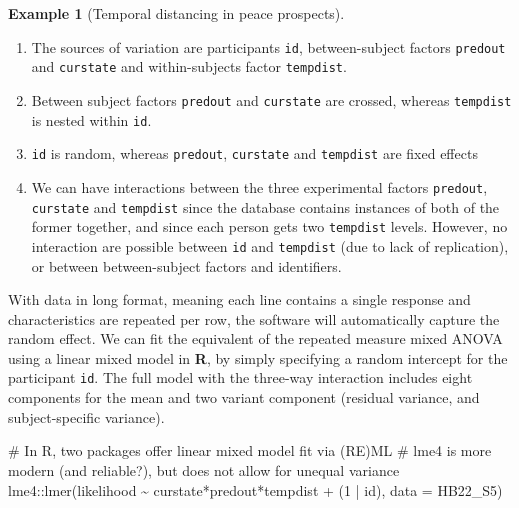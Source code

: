 \documentclass[
  11pt,
  letterpaper,
]{scrbook}
\newenvironment{Shaded}{\begin{snugshade}}{\end{snugshade}}
\newcommand{\AttributeTok}[1]{\textcolor[rgb]{0.40,0.45,0.13}{#1}}
\newcommand{\CommentTok}[1]{\textcolor[rgb]{0.37,0.37,0.37}{#1}}
\newcommand{\DecValTok}[1]{\textcolor[rgb]{0.68,0.00,0.00}{#1}}
\newcommand{\FunctionTok}[1]{\textcolor[rgb]{0.28,0.35,0.67}{#1}}
\newcommand{\NormalTok}[1]{\textcolor[rgb]{0.00,0.23,0.31}{#1}}
\newcommand{\SpecialCharTok}[1]{\textcolor[rgb]{0.37,0.37,0.37}{#1}}
\providecommand{\tightlist}{%
  \setlength{\itemsep}{0pt}\setlength{\parskip}{0pt}}\usepackage{longtable,booktabs,array}
\theoremstyle{definition}
\theoremstyle{definition}
\newtheorem{example}{Example}[chapter]
\theoremstyle{remark}
\begin{document}
\begin{example}[Temporal distancing in peace
prospects]
\begin{enumerate}
\def\labelenumi{\arabic{enumi}.}
\tightlist
\item
  The sources of variation are participants \texttt{id}, between-subject
  factors \texttt{predout} and \texttt{curstate} and within-subjects
  factor \texttt{tempdist}.
\item
  Between subject factors \texttt{predout} and \texttt{curstate} are
  crossed, whereas \texttt{tempdist} is nested within \texttt{id}.
\item
  \texttt{id} is random, whereas \texttt{predout}, \texttt{curstate} and
  \texttt{tempdist} are fixed effects
\item
  We can have interactions between the three experimental factors
  \texttt{predout}, \texttt{curstate} and \texttt{tempdist} since the
  database contains instances of both of the former together, and since
  each person gets two \texttt{tempdist} levels. However, no interaction
  are possible between \texttt{id} and \texttt{tempdist} (due to lack of
  replication), or between between-subject factors and identifiers.
\end{enumerate}

With data in long format, meaning each line contains a single response
and characteristics are repeated per row, the software will
automatically capture the random effect. We can fit the equivalent of
the repeated measure mixed ANOVA using a linear mixed model in
\textbf{R}, by simply specifying a random intercept for the participant
\texttt{id}. The full model with the three-way interaction includes
eight components for the mean and two variant component (residual
variance, and subject-specific variance).

\begin{Shaded}
\begin{Highlighting}[]
\CommentTok{\# In R, two packages offer linear mixed model fit via (RE)ML}
\CommentTok{\# lme4 is more modern (and reliable?), but does not allow for unequal variance}
\NormalTok{lme4}\SpecialCharTok{::}\FunctionTok{lmer}\NormalTok{(likelihood }\SpecialCharTok{\textasciitilde{}}\NormalTok{ curstate}\SpecialCharTok{*}\NormalTok{predout}\SpecialCharTok{*}\NormalTok{tempdist }\SpecialCharTok{+}\NormalTok{ (}\DecValTok{1} \SpecialCharTok{|}\NormalTok{ id),}
           \AttributeTok{data =}\NormalTok{ HB22\_S5)}
\end{Highlighting}
\end{Shaded}


\end{example}
\end{document}
